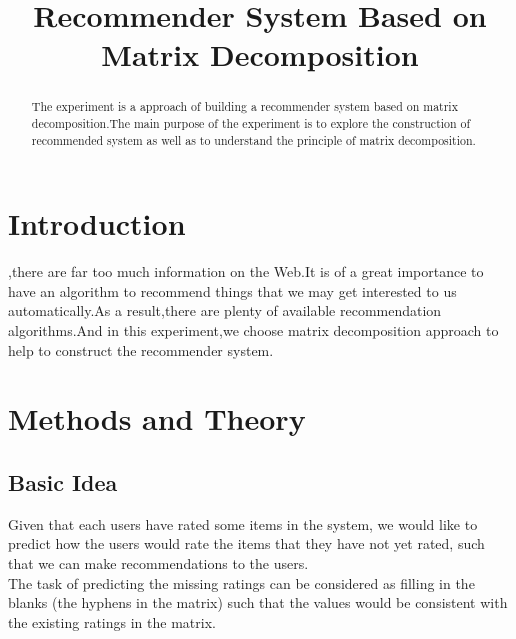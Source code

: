 \documentclass[journal, a4paper]{IEEEtran}
\begin{document}
	\title{Recommender System Based on Matrix Decomposition}
	\maketitle

\begin{abstract}
The experiment is a approach of building a recommender system  based on matrix decomposition.The main purpose of the experiment is to explore the construction of recommended system as well as to understand the principle of matrix decomposition.
\end{abstract}

\section{Introduction}
,there are far too much information on  the Web.It is of a great importance to have an algorithm to recommend things that we may get interested to us automatically.As a result,there are plenty of available recommendation algorithms.And in this experiment,we choose matrix decomposition approach to help to construct the recommender system.

\section{Methods and Theory}
\subsection{Basic Idea}
Given that each users have rated some items in the system, we would like to predict how the users would rate the items that they have not yet rated, such that we can make recommendations to the users.\\
The task of predicting the missing ratings can be considered as filling in the blanks (the hyphens in the matrix) such that the values would be consistent with the existing ratings in the matrix.
\end{document}
